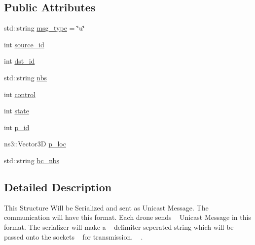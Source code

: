 \subsection*{Public Attributes}
\begin{DoxyCompactItemize}
\item 
std\+::string \hyperlink{structrnl_1_1USMsg_a0c4415383a4538f816a5f6c5b3c7bc0c}{msg\+\_\+type} = \char`\"{}u\char`\"{}
\item 
int \hyperlink{structrnl_1_1USMsg_a8d932a3c3e2d68ab482690d928f2122c}{source\+\_\+id}
\item 
int \hyperlink{structrnl_1_1USMsg_aa32b12bdbdc2b70868b817732cd56142}{dst\+\_\+id}
\item 
std\+::string \hyperlink{structrnl_1_1USMsg_a07dbb4f4edfc36645da120c1a6d1a27a}{nbs}
\item 
int \hyperlink{structrnl_1_1USMsg_a5d4412de9964a106ea0cc410ceba25ec}{control}
\item 
int \hyperlink{structrnl_1_1USMsg_a61782d57a1479e4cf0cb2be423278141}{state}
\item 
int \hyperlink{structrnl_1_1USMsg_ae935777e9a7fe3f25fffe1984d717e5b}{p\+\_\+id}
\item 
ns3\+::\+Vector3D \hyperlink{structrnl_1_1USMsg_ad0bc959b108e315f64ce7b1a8ba19f32}{p\+\_\+loc}
\item 
std\+::string \hyperlink{structrnl_1_1USMsg_a4a3f5cd9c3d9aaf660e77f4fd8b63d89}{bc\+\_\+nbs}
\end{DoxyCompactItemize}


\subsection{Detailed Description}
This Structure Will be Serialized and sent as Unicast Message. The ~\newline
communication will have this format. Each drone sends ~\newline
Unicast Message in this format. The serializer will make a ~\newline
delimiter seperated string which will be passed onto the sockets ~\newline
for transmission. ~\newline
. 


